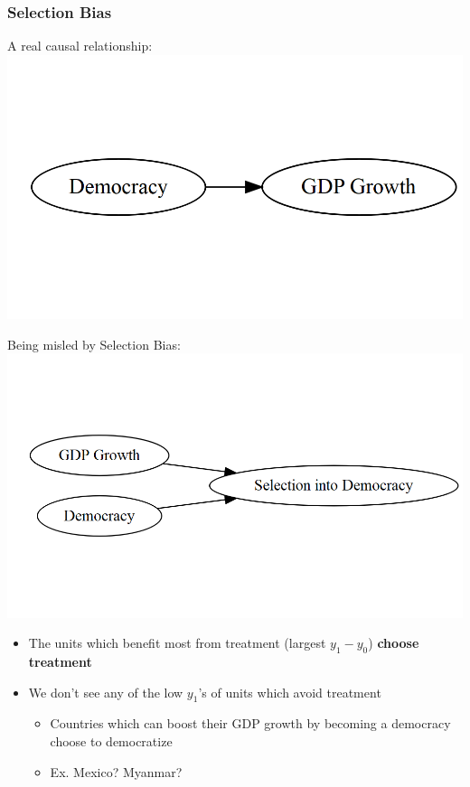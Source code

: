\documentclass[xcolor=x11names,compress]{beamer}\usepackage[]{graphicx}\usepackage[]{color}
\makeatletter
\def\maxwidth{ %
  \ifdim\Gin@nat@width>\linewidth
    \linewidth
  \else
    \Gin@nat@width
  \fi
}
\newenvironment{knitrout}{}{} %
\renewcommand{\(}{\begin{columns}}
\renewcommand{\)}{\end{columns}}
\newcommand{\<}[1]{\begin{column}{#1}}
\renewcommand{\>}{\end{column}}
\makeatother
\begin{document}
\begin{frame}
\frametitle{Selection Bias}
\begin{multicols}{2}
A real causal relationship:
\begin{knitrout}
\color{fgcolor}
\includegraphics[width=\maxwidth]{figure/explanation9b-1} 

\end{knitrout}
\columnbreak
Being misled by Selection Bias:
\begin{knitrout}
\color{fgcolor}
\includegraphics[width=\maxwidth]{figure/explanation10b-1} 

\end{knitrout}
\end{multicols}
\begin{itemize}
\pause
\item The units which benefit most from treatment (largest $y_1-y_0$) \textbf{choose treatment}
\pause
\item We don't see any of the low $y_1$'s of units which avoid treatment
\begin{itemize}
\pause
\item Countries which can boost their GDP growth by becoming a democracy choose to democratize
\pause
\item Ex. Mexico? Myanmar?
\end{itemize}
\end{itemize}
\end{frame}
\end{document}
